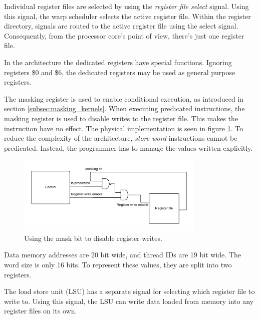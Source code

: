 Individual register files are selected by using the \emph{register file select} signal.
Using this signal, the warp scheduler selects the active register file.
Within the register directory, signals are routed to the active register file using the select signal.
Consequently, from the processor core's point of view, there's just one register file.

In the architecture the dedicated registers have special functions.
Ignoring registers \$0 and \$6, the dedicated registers may be used as general purpose registers.

The masking register is used to enable conditional execution, as introduced in section \ref{subsec:masking_kernels}.
When executing predicated instructions, the masking register is used to disable writes to the register file.
This makes the instruction have no effect. The physical implementation is seen in figure \ref{fig:masking}.
To reduce the complexity of the architecture, \emph{store word} instructions cannot be predicated.
Instead, the programmer has to manage the values written explicitly.

\begin{figure}[H]
	\centering
	\includegraphics[width=0.8\textwidth]{../gpu/diagrams/masking.png}
	\caption{Using the mask bit to disable register writes.}
	\label{fig:masking}
\end{figure}

Data memory addresses are 20 bit wide, and thread IDs are 19 bit wide.
The word size is only 16 bits.
To represent these values, they are split into two registers.

The load store unit (LSU) has a separate signal for selecting which register file to write to.
Using this signal, the LSU can write data loaded from memory into any register files on its own.
